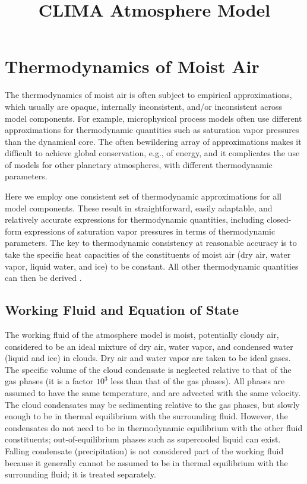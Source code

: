 \documentclass{report}
\title{CLIMA Atmosphere Model}
\author{ }
\begin{document}
\maketitle
\tableofcontents

\chapter{Thermodynamics of Moist Air}\label{s:thermodynamics}

The thermodynamics of moist air is often subject to empirical approximations, which usually are opaque, internally inconsistent, and/or inconsistent across model components. For example, microphysical process models often use different approximations for thermodynamic quantities such as saturation vapor pressures than the dynamical core. The often bewildering array of approximations makes it difficult to achieve global conservation, e.g., of energy, and it complicates the use of models for other planetary atmospheres, with different thermodynamic parameters. 

Here we employ one consistent set of thermodynamic approximations for all model components. These result in straightforward, easily adaptable, and relatively accurate expressions for thermodynamic quantities, including closed-form expressions of saturation vapor pressures in terms of thermodynamic parameters. The key to thermodynamic consistency at reasonable accuracy is to take the specific heat capacities of the constituents of moist air (dry air, water vapor, liquid water, and ice) to be constant. All other thermodynamic quantities can then be derived \citep[cf.][]{Romps08a,Marquet16a}. 

\section{Working Fluid and Equation of State}

The working fluid of the atmosphere model is moist, potentially cloudy air, considered to be an ideal mixture of dry air, water vapor, and condensed water (liquid and ice) in clouds. Dry air and water vapor are taken to be ideal gases. The specific volume of the cloud condensate is neglected relative to that of the gas phases (it is a  factor $10^{3}$ less than that of the gas phases). All phases are assumed to have the same temperature, and are advected with the same velocity. The cloud condensates may be sedimenting relative to the gas phases, but slowly enough to be in thermal equilibrium with the surrounding fluid. However, the condensates do not need to be in thermodynamic equilibrium with the other fluid constituents; out-of-equilibrium phases such as supercooled liquid can exist. Falling condensate (precipitation) is not considered part of the working fluid because it generally cannot be assumed to be in thermal equilibrium with the surrounding fluid; it is treated separately.
\end{document}
